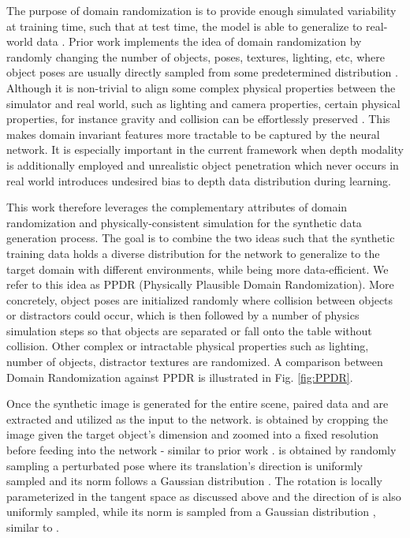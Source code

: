 \documentclass[letterpaper, 10 pt, conference]{ieeeconf}
\begin{document}
The purpose of domain randomization is to provide enough simulated variability at training time, such that at test time, the model is able to generalize to real-world data \cite{tobin2017domain}. Prior work implements the idea of domain randomization by randomly changing the number of objects, poses, textures, lighting, etc, where object poses are usually directly sampled from some predetermined distribution \cite{tobin2017domain,xiang2017posecnn,tremblay2018deep}. Although it is non-trivial to align some complex physical properties between the simulator and real world, such as lighting and camera properties, certain physical properties, for instance gravity and collision can be effortlessly preserved \cite{tremblay2018falling,mitash2017self}. This makes domain invariant features more tractable to be captured by the neural network. It is especially important in the current framework when depth modality is additionally employed and unrealistic object penetration which never occurs in real world introduces undesired bias to depth data distribution during learning.

This work therefore leverages the complementary attributes of domain randomization and physically-consistent simulation for the synthetic data generation process. The goal is to combine the two ideas such that the synthetic training data holds a diverse distribution for the network to generalize to the target domain with different environments, while being more data-efficient. We refer to this idea as PPDR (Physically Plausible Domain Randomization). More concretely, object poses are initialized randomly where collision between objects or distractors could occur, which is then followed by a number of physics simulation steps so that objects are separated or fall onto the table without collision. Other complex or intractable physical properties such as lighting, number of objects, distractor textures are randomized. A comparison between Domain Randomization against PPDR is illustrated in Fig. \ref{fig:PPDR}. 

Once the synthetic image is generated for the entire scene, paired data  and  are extracted and utilized as the input to the network.  is obtained by cropping the image given the target object's dimension and zoomed into a fixed resolution  before feeding into the network - similar to prior work \cite{li2018deepim}.  is obtained by randomly sampling a perturbated pose  where its translation's direction is uniformly sampled and its norm follows a Gaussian distribution  . The rotation is locally parameterized in the tangent space  as discussed above and the direction of  is also uniformly sampled, while its norm is sampled from a Gaussian distribution , similar to .
\end{document}
